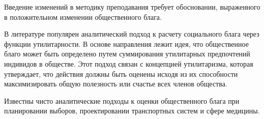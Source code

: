 Введение изменений в методику преподавания требует
обосновании, выраженного в положительном изменении общественного блага.

В литературе популярен аналитический подход к расчету социального блага через функции утилитарности.
В основе направления лежит идея, что общественное благо может
быть определено путем суммирования утилитарных предпочтений индивидов в обществе.
Этот подход связан с концепцией утилитаризма, которая утверждает, 
что действия должны быть оценены исходя из их способности максимизировать общую полезность или счастье всех членов общества.

Известны чисто аналитические подходы к оценки общественного блага при планировании выборов,
 проектировании транспортных систем и сфере медицины.
